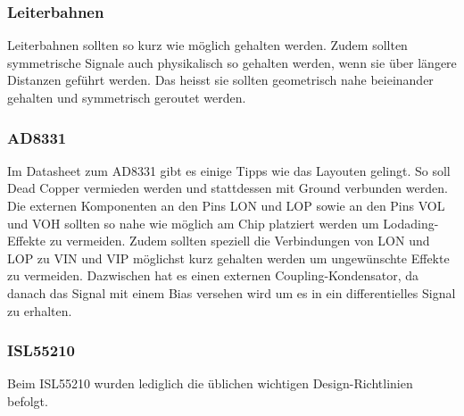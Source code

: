 \subsubsection*{Leiterbahnen}
Leiterbahnen sollten so kurz wie möglich gehalten werden. Zudem sollten symmetrische Signale auch physikalisch so gehalten werden, wenn sie über längere Distanzen geführt werden. Das heisst sie sollten geometrisch nahe beieinander gehalten und symmetrisch geroutet werden. 

\subsubsection*{AD8331}
Im Datasheet zum AD8331 gibt es einige Tipps wie das Layouten gelingt. So soll Dead Copper vermieden werden und stattdessen mit Ground verbunden werden.
Die externen Komponenten an den Pins LON und LOP sowie an den Pins VOL und VOH sollten so nahe wie möglich am Chip platziert werden um Lodading-Effekte zu vermeiden.
Zudem sollten speziell die Verbindungen von LON und LOP zu VIN und VIP möglichst kurz gehalten werden um ungewünschte Effekte zu vermeiden. Dazwischen hat es einen externen Coupling-Kondensator, da danach das Signal mit einem Bias versehen wird um es in ein differentielles Signal zu erhalten.

\subsubsection*{ISL55210}
Beim ISL55210 wurden lediglich die üblichen wichtigen Design-Richtlinien befolgt. 


